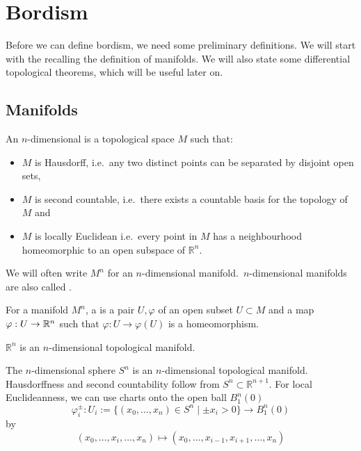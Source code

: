 \documentclass[a4paper,12pt]{article}
\begin{document}


\section{Bordism}

Before we can define bordism, we need some preliminary definitions. We will start with the recalling the definition of manifolds. We will also state some differential topological theorems, which will be useful later on.

\subsection{Manifolds}

\begin{definition}
    An \(n\)-dimensional  is a topological space \(M\) such that:
    \begin{itemize}
        \item \(M\) is Hausdorff, i.e.\ any two distinct points can be separated by disjoint open sets,
        \item \(M\) is second countable, i.e.\ there exists a countable basis for the topology of \(M\) and
        \item \(M\) is locally Euclidean i.e.\ every point in \(M\) has a neighbourhood homeomorphic to an open subspace of \(\mathbb{R}^n\).
    \end{itemize}
    We will often write \(M^n\) for an \(n\)-dimensional manifold.\ \(n\)-dimensional manifolds are also called .
\end{definition}

\begin{definition}[Chart]
    For a manifold \(M^n\), a  is a pair \(U,\varphi\) of an open subset \(U\subset M\) and a map \(\varphi:U\to\mathbb{R}^n\) such that \(\varphi:U\to\varphi(U)\) is a homeomorphism.
\end{definition}

\begin{example}
    \(\mathbb{R}^n\) is an \(n\)-dimensional topological manifold.
\end{example}

\begin{example}\label{sphere chart}
    The \(n\)-dimensional sphere \(S^n\) is an \(n\)-dimensional topological manifold. Hausdorffness and second countability follow from \(S^n\subset \mathbb{R}^{n+1}\). For local Euclideanness, we can use charts onto the open ball \(B_1^n(0)\)
     \[\varphi_i^\pm:U_i:=\{(x_0,\dots,x_n)\in S^n\mid \pm x_i>0\}\to B_1^n(0)\] by \[(x_0,\dots,x_i,\dots,x_n)\mapsto(x_0,\dots,x_{i-1},x_{i+1},\dots,x_n)\]
\end{example}
\end{document}
